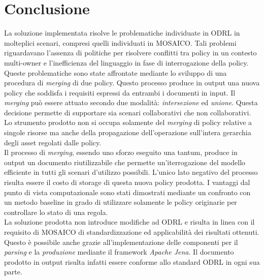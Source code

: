\documentclass[12pt,a4paper,twoside]{book}
\begin{document}
\chapter{Conclusione}
La soluzione implementata risolve le problematiche individuate in ODRL in molteplici scenari, compresi quelli individuati in MOSAICO. Tali problemi riguardavano l'assenza di politiche per risolvere conflitti tra policy in un contesto multi-owner e l'inefficienza del linguaggio in fase di interrogazione della policy. Queste problematiche sono state affrontate mediante lo sviluppo di una procedura di \textit{merging} di due policy. Questo processo produce in output una nuova policy che soddisfa i requisiti espressi da entrambi i documenti in input. Il \textit{merging} può essere attuato secondo due modalità: \textit{intersezione} ed \textit{unione}. Questa decisione permette di supportare sia scenari collaborativi che non collaborativi. Lo strumento prodotto non si occupa solamente del \textit{merging} di policy relative a singole risorse ma anche della propagazione dell'operazione sull'intera gerarchia degli asset regolati dalle policy.\\
Il processo di \textit{merging}, essendo uno sforzo eseguito una tantum, produce in output un documento riutilizzabile che permette un'iterrogazione del modello efficiente in tutti gli scenari d'utilizzo possibili. L'unico lato negativo del processo risulta essere il costo di storage di questa nuova policy prodotta. I vantaggi dal punto di vista computazionale sono stati dimostrati mediante un confronto con un metodo baseline in grado di utilizzare solamente le policy originarie per controllare lo stato di una regola.\\
La soluzione prodotta non introduce modifiche ad ODRL e risulta in linea con il requisito di MOSAICO di standardizzazione ed applicabilità dei risultati ottenuti. Questo è possibile anche grazie all'implementazione delle componenti per il \textit{parsing} e la \textit{produzione} mediante il framework \textit{Apache Jena}. Il documento prodotto in output risulta infatti essere conforme allo standard ODRL in ogni sua parte. 
{}

\end{document}
